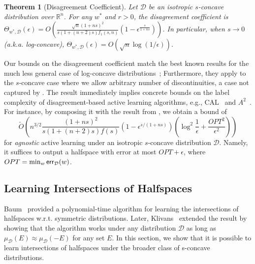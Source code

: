 \documentclass[11pt]{article}
\newcommand{\cD}{\mathcal{D}}
\newcommand{\R}{\mathbb{R}}
\newcommand{\err}{\textup{\textsf{err}}}
\newtheorem{theorem}{Theorem}
\begin{document}
\begin{theorem}[Disagreement Coefficient]
\label{theorem: disagreement coefficient}
Let $\mathcal{D}$ be an isotropic $s$-concave distribution over $\R^n$. For any $w^*$ and $r>0$, the disagreement coefficient is $\Theta_{w^*,\mathcal{D}}(\epsilon)=O\left(\frac{\sqrt{n}(1+ns)^2}{s(1+(n+2)s)f_1(s,n)}(1-\epsilon^{\frac{s}{1+ns}})\right)$. In particular, when $s\rightarrow0$ (a.k.a. log-concave), $\Theta_{w^*,\mathcal{D}}(\epsilon)=O(\sqrt{n}\log(1/\epsilon))$.
\end{theorem}



Our bounds on the disagreement coefficient match the best known results for the much less general case of log-concave distributions~\cite{balcan2013active}; Furthermore, they apply to the $s$-concave case where we allow arbitrary number of discontinuities, a case not captured by \cite{friedman2009active}. The result immediately implies concrete bounds on the label complexity of disagreement-based active learning algorithms, e.g., CAL~\cite{cohn1994improving} and $A^2$~\cite{balcan2009agnostic}. For instance, by composing it with the result from \cite{dasgupta2007general}, we obtain a bound of
$$\widetilde O\left(n^{3/2}\frac{(1+ns)^2}{s(1+(n+2)s)f(s)}(1-\epsilon^{s/(1+ns)})\left(\log^2 \frac{1}{\epsilon}+\frac{OPT^2}{\epsilon^2}\right)\right)$$
for \emph{agnostic} active learning under an isotropic $s$-concave distribution $\cD$. Namely, it suffices to output a halfspace with error at most $OPT+\epsilon$, where $OPT=\min_{w}\err_\cD(w)$.


\subsection{Learning Intersections of Halfspaces}



Baum~\cite{baum1990polynomial} provided a polynomial-time algorithm for learning the intersections of halfspaces w.r.t. symmetric distributions. Later, Klivans~\cite{klivans2009baum} extended the result by showing that the algorithm works under any distribution $\cD$ as long as $\mu_\cD(E)\approx\mu_\cD(-E)$ for any set $E$. In this section, we show that it is possible to learn intersections of halfspaces under the broader class of s-concave distributions.
\end{document}
